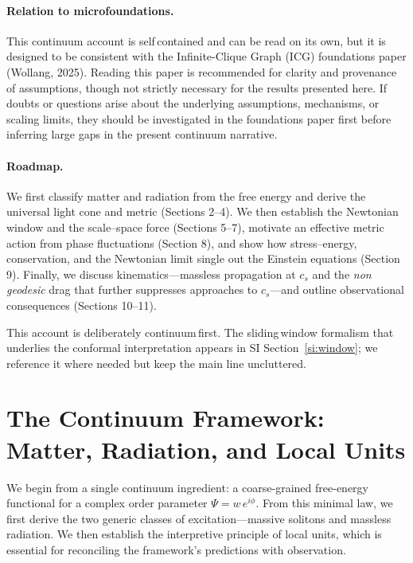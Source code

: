 \documentclass[11pt]{article}
\begin{document}
\paragraph{Relation to microfoundations.} This continuum account is self\,contained and can be read on its own, but it is designed to be consistent with the Infinite-Clique Graph (ICG) foundations paper (Wollang, 2025). Reading this paper is recommended for clarity and provenance of assumptions, though not strictly necessary for the results presented here. If doubts or questions arise about the underlying assumptions, mechanisms, or scaling limits, they should be investigated in the foundations paper first before inferring large gaps in the present continuum narrative.

\paragraph{Roadmap.} We first classify matter and radiation from the free energy and derive the universal light cone and metric (Sections 2–4). We then establish the Newtonian window and the scale–space force (Sections 5–7), motivate an effective metric action from phase fluctuations (Section 8), and show how stress–energy, conservation, and the Newtonian limit single out the Einstein equations (Section 9). Finally, we discuss kinematics—massless propagation at $c_s$ and the \emph{non\,geodesic} drag that further suppresses approaches to $c_s$—and outline observational consequences (Sections 10–11).

This account is deliberately continuum\,first. The sliding\,window formalism that underlies the conformal interpretation appears in SI Section~\ref{si:window}; we reference it where needed but keep the main line uncluttered.

\section{The Continuum Framework: Matter, Radiation, and Local Units}
We begin from a single continuum ingredient: a coarse-grained free-energy functional for a complex order parameter $\Psi = w\,e^{i\phi}$. From this minimal law, we first derive the two generic classes of excitation—massive solitons and massless radiation. We then establish the interpretive principle of local units, which is essential for reconciling the framework's predictions with observation.
\end{document}
